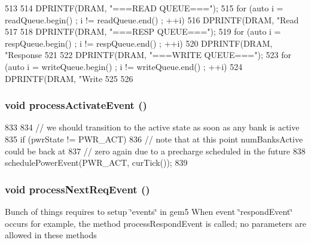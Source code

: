 \begin{DoxyCode}
513                         {
514     DPRINTF(DRAM, "===READ QUEUE===\n\n");
515     for (auto i = readQueue.begin() ;  i != readQueue.end() ; ++i) {
516         DPRINTF(DRAM, "Read %
517     }
518     DPRINTF(DRAM, "\n===RESP QUEUE===\n\n");
519     for (auto i = respQueue.begin() ;  i != respQueue.end() ; ++i) {
520         DPRINTF(DRAM, "Response %
521     }
522     DPRINTF(DRAM, "\n===WRITE QUEUE===\n\n");
523     for (auto i = writeQueue.begin() ;  i != writeQueue.end() ; ++i) {
524         DPRINTF(DRAM, "Write %
525     }
526 }
\end{DoxyCode}
\hypertarget{classDRAMCtrl_ac54213c91d7d83dfe481534b1f165391}{
\subsubsection[{processActivateEvent}]{\setlength{\rightskip}{0pt plus 5cm}void processActivateEvent ()}}
\label{classDRAMCtrl_ac54213c91d7d83dfe481534b1f165391}



\begin{DoxyCode}
833 {
834     // we should transition to the active state as soon as any bank is active
835     if (pwrState != PWR_ACT)
836         // note that at this point numBanksActive could be back at
837         // zero again due to a precharge scheduled in the future
838         schedulePowerEvent(PWR_ACT, curTick());
839 }
\end{DoxyCode}
\hypertarget{classDRAMCtrl_a0798c7e6d736756005d72ec03a38badd}{
\subsubsection[{processNextReqEvent}]{\setlength{\rightskip}{0pt plus 5cm}void processNextReqEvent ()}}
\label{classDRAMCtrl_a0798c7e6d736756005d72ec03a38badd}
Bunch of things requires to setup \char`\"{}events\char`\"{} in gem5 When event \char`\"{}respondEvent\char`\"{} occurs for example, the method processRespondEvent is called; no parameters are allowed in these methods 


